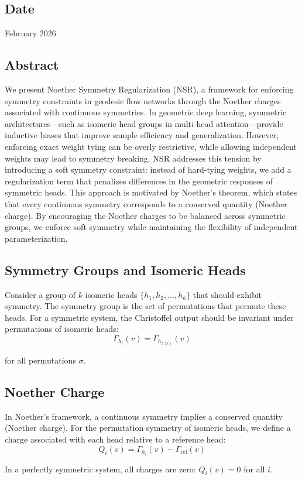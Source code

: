 \subsection*{Date}
February 2026
\subsection*{Abstract}
We present Noether Symmetry Regularization (NSR), a framework for enforcing symmetry constraints in geodesic flow networks through the Noether charges associated with continuous symmetries. In geometric deep learning, symmetric architectures—such as isomeric head groups in multi-head attention—provide inductive biases that improve sample efficiency and generalization. However, enforcing exact weight tying can be overly restrictive, while allowing independent weights may lead to symmetry breaking. NSR addresses this tension by introducing a soft symmetry constraint: instead of hard-tying weights, we add a regularization term that penalizes differences in the geometric responses of symmetric heads. This approach is motivated by Noether's theorem, which states that every continuous symmetry corresponds to a conserved quantity (Noether charge). By encouraging the Noether charges to be balanced across symmetric groups, we enforce soft symmetry while maintaining the flexibility of independent parameterization.

\subsection{Symmetry Groups and Isomeric Heads}
Consider a group of $k$ isomeric heads $\{h_1, h_2, ..., h_k\}$ that should exhibit symmetry. The symmetry group is the set of permutations that permute these heads. For a symmetric system, the Christoffel output should be invariant under permutations of isomeric heads:
$$\Gamma_{h_i}(v) = \Gamma_{h_{\sigma(i)}}(v)$$

for all permutations $\sigma$.

\subsection{Noether Charge}
In Noether's framework, a continuous symmetry implies a conserved quantity (Noether charge). For the permutation symmetry of isomeric heads, we define a charge associated with each head relative to a reference head:
$$Q_i(v) = \Gamma_{h_i}(v) - \Gamma_{\text{ref}}(v)$$

In a perfectly symmetric system, all charges are zero: $Q_i(v) = 0$ for all $i$.

